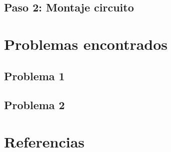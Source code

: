 \documentclass{article}
\begin{document}
	

\subsection{Paso 2: Montaje circuito}
\section{Problemas encontrados}
\subsection{Problema 1} 
\subsection{Problema 2}
\section{Referencias}
\end{document}
